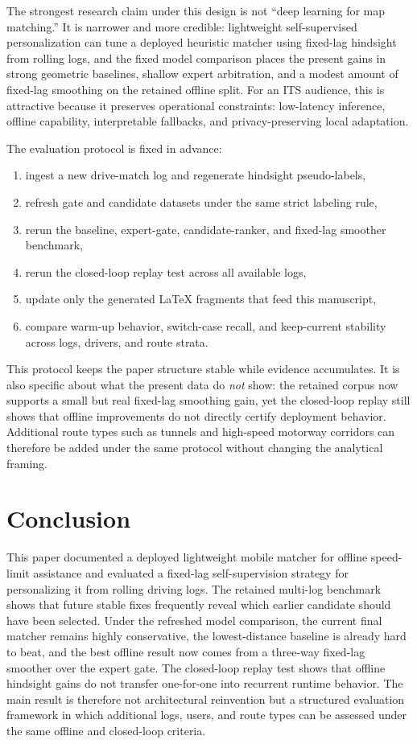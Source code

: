\documentclass{article}
\begin{document}
The strongest research claim under this design is not ``deep learning for map matching.'' It is narrower and more credible: lightweight self-supervised personalization can tune a deployed heuristic matcher using fixed-lag hindsight from rolling logs, and the fixed model comparison places the present gains in strong geometric baselines, shallow expert arbitration, and a modest amount of fixed-lag smoothing on the retained offline split. For an ITS audience, this is attractive because it preserves operational constraints: low-latency inference, offline capability, interpretable fallbacks, and privacy-preserving local adaptation.

The evaluation protocol is fixed in advance:
\begin{enumerate}[leftmargin=*,itemsep=2pt]
\item ingest a new drive-match log and regenerate hindsight pseudo-labels,
\item refresh gate and candidate datasets under the same strict labeling rule,
\item rerun the baseline, expert-gate, candidate-ranker, and fixed-lag smoother benchmark,
\item rerun the closed-loop replay test across all available logs,
\item update only the generated LaTeX fragments that feed this manuscript,
\item compare warm-up behavior, switch-case recall, and keep-current stability across logs, drivers, and route strata.
\end{enumerate}

This protocol keeps the paper structure stable while evidence accumulates. It is also specific about what the present data do \emph{not} show: the retained corpus now supports a small but real fixed-lag smoothing gain, yet the closed-loop replay still shows that offline improvements do not directly certify deployment behavior. Additional route types such as tunnels and high-speed motorway corridors can therefore be added under the same protocol without changing the analytical framing.

\section{Conclusion}
This paper documented a deployed lightweight mobile matcher for offline speed-limit assistance and evaluated a fixed-lag self-supervision strategy for personalizing it from rolling driving logs. The retained multi-log benchmark shows that future stable fixes frequently reveal which earlier candidate should have been selected. Under the refreshed model comparison, the current final matcher remains highly conservative, the lowest-distance baseline is already hard to beat, and the best offline result now comes from a three-way fixed-lag smoother over the expert gate. The closed-loop replay test shows that offline hindsight gains do not transfer one-for-one into recurrent runtime behavior. The main result is therefore not architectural reinvention but a structured evaluation framework in which additional logs, users, and route types can be assessed under the same offline and closed-loop criteria.



\end{document}
